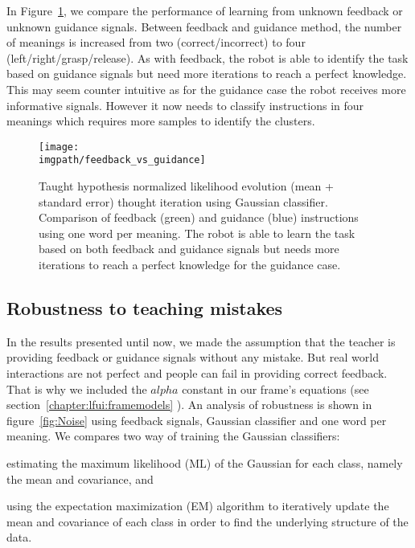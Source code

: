 In Figure~\ref{fig:Guidance}, we compare the performance of learning from unknown feedback or unknown guidance signals. Between feedback and guidance method, the number of meanings is increased from two (correct/incorrect) to four (left/right/grasp/release). As with feedback, the robot is able to identify the task based on guidance signals but need more iterations to reach a perfect knowledge. This may seem counter intuitive as for the guidance case the robot receives more informative signals. However it now needs to classify instructions in four meanings which requires more samples to identify the clusters. 

\begin{figure}[!ht]
  \centering
  \texttt{[image: \\imgpath/feedback\_vs\_guidance]}
  \caption{Taught hypothesis normalized likelihood evolution (mean + standard error) thought iteration using Gaussian classifier. Comparison of feedback (green) and guidance (blue) instructions using one word per meaning. The robot is able to learn the task based on both feedback and guidance signals but needs more iterations to reach a perfect knowledge for the guidance case.}
  \label{fig:Guidance}
\end{figure}

\subsection{Robustness to teaching mistakes}

In the results presented until now, we made the assumption that the teacher is providing feedback or guidance signals without any mistake. But real world interactions are not perfect and people can fail in providing correct feedback. That is why we included the $alpha$ constant in our frame's equations (see section~\ref{chapter:lfui:framemodels}
). An analysis of robustness is shown in figure~\ref{fig:Noise} using feedback signals, Gaussian classifier and one word per meaning. We compares two way of training the Gaussian classifiers: \begin{inparaenum}[a)] \item estimating the maximum likelihood (ML) of the Gaussian for each class, namely the mean and covariance, and \item using the expectation maximization (EM) algorithm to iteratively update the mean and covariance of each class in order to find the underlying structure of the data. \end{inparaenum} 

